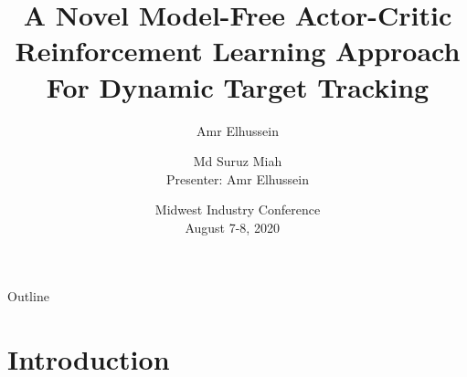 \documentclass{beamer}
\title[A Novel Model-Free Actor-Critic Reinforcement Learning Approach For Dynamic Target Tracking]{A Novel Model-Free Actor-Critic Reinforcement Learning Approach For Dynamic Target Tracking}
\author[A.Elhussein,~and~S.~Miah]{Amr Elhussein \and Md Suruz Miah\\ Presenter: Amr Elhussein}
\institute[shortinst] %
{
    Electrical and Computer Engineering, Bradley University, Peoria, IL, USA
}
\date[MIC~2020]
{{\footnotesize Midwest Industry Conference
\\
August 7-8, 2020 ~}
}
\begin{document}
\begin{frame}
  \titlepage
\end{frame}

\begin{frame}{Outline}
  \tableofcontents
\end{frame}

\section{Introduction}

\end{document}
